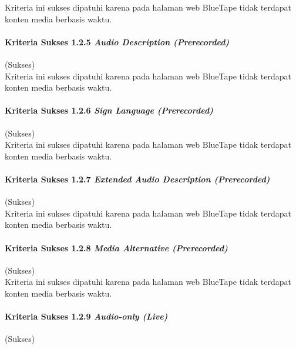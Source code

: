 Kriteria ini sukses dipatuhi karena pada halaman web BlueTape tidak terdapat konten media berbasis waktu.

\paragraph{Kriteria Sukses 1.2.5 \textit{Audio Description (Prerecorded)}}
\label{par:kepatuhan_bluetape_kriteria_sukses_1.2.5}
(Sukses)\\

Kriteria ini sukses dipatuhi karena pada halaman web BlueTape tidak terdapat konten media berbasis waktu.

\paragraph{Kriteria Sukses 1.2.6 \textit{Sign Language (Prerecorded)}}
\label{par:kepatuhan_bluetape_kriteria_sukses_1.2.6}
(Sukses)\\

Kriteria ini sukses dipatuhi karena pada halaman web BlueTape tidak terdapat konten media berbasis waktu.

\paragraph{Kriteria Sukses 1.2.7 \textit{Extended Audio Description (Prerecorded)}}
\label{par:kepatuhan_bluetape_kriteria_sukses_1.2.7}
(Sukses)\\

Kriteria ini sukses dipatuhi karena pada halaman web BlueTape tidak terdapat konten media berbasis waktu.

\paragraph{Kriteria Sukses 1.2.8 \textit{Media Alternative (Prerecorded)}}
\label{par:kepatuhan_bluetape_kriteria_sukses_1.2.8}
(Sukses)\\

Kriteria ini sukses dipatuhi karena pada halaman web BlueTape tidak terdapat konten media berbasis waktu.

\paragraph{Kriteria Sukses 1.2.9 \textit{Audio-only (Live)}}
\label{par:kepatuhan_bluetape_kriteria_sukses_1.2.9}
(Sukses)\\

